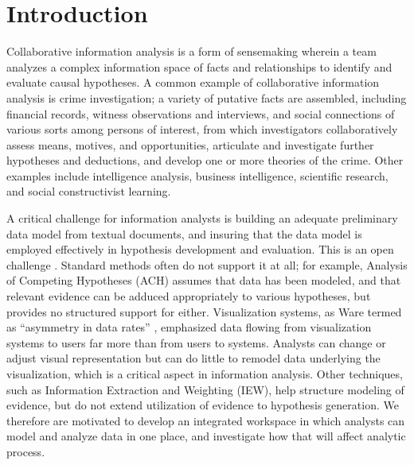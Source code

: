 \section{Introduction}\label{introduction}

Collaborative information analysis is a form of sensemaking wherein a
team analyzes a complex information space of facts and relationships to
identify and evaluate causal hypotheses. A common example of
collaborative information analysis is crime investigation; a variety of
putative facts are assembled, including financial records, witness
observations and interviews, and social connections of various sorts
among persons of interest, from which investigators collaboratively
assess means, motives, and opportunities, articulate and investigate
further hypotheses and deductions, and develop one or more theories of
the crime. Other examples include intelligence analysis, business
intelligence, scientific research, and social constructivist learning.

A critical challenge for information analysts is building an adequate
preliminary data model from textual documents, and insuring that the data model
is employed effectively in hypothesis development and evaluation. This is an
open challenge \autocite{Badalamente2005}. Standard methods often do not support
it at all; for example, Analysis of Competing Hypotheses (ACH) assumes that data
has been modeled, and that relevant evidence can be adduced appropriately to
various hypotheses, but provides no structured support for either. Visualization
systems, as Ware termed as ``asymmetry in data rates'' \autocite[382]{Ware2012},
emphasized data flowing from visualization systems to users far more than from
users to systems. Analysts can change or adjust visual representation but can do
little to remodel data underlying the visualization, which is a critical aspect
in information analysis. Other techniques, such as Information Extraction and
Weighting (IEW), help structure modeling of evidence, but do not extend
utilization of evidence to hypothesis generation. We therefore are motivated to
develop an integrated workspace in which analysts can model and analyze data in
one place, and investigate how that will affect analytic process.

